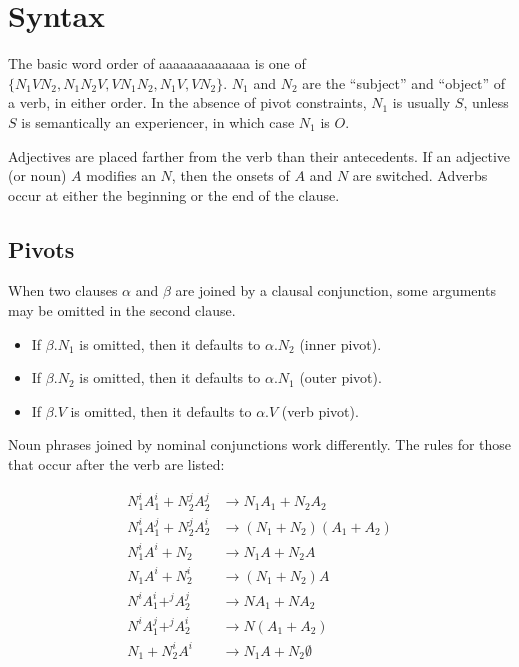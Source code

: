 \documentclass{book}
\newcommand{\lname}{aaaaaaaaaaaaa}
\begin{document}
\chapter{Syntax}

The basic word order of \lname{} is one of $\{N_1VN_2, N_1N_2V, VN_1N_2, N_1V, VN_2\}$. $N_1$ and $N_2$ are the ``subject'' and ``object'' of a verb, in either order. In the absence of pivot constraints, $N_1$ is usually $S$, unless $S$ is semantically an experiencer, in which case $N_1$ is $O$.

Adjectives are placed farther from the verb than their antecedents. If an adjective (or noun) $A$ modifies an $N$, then the onsets of $A$ and $N$ are switched. Adverbs occur at either the beginning or the end of the clause.

\section{Pivots}

When two clauses $\alpha$ and $\beta$ are joined by a clausal conjunction, some arguments may be omitted in the second clause.

\begin{itemize}
  \item If $\beta.N_1$ is omitted, then it defaults to $\alpha.N_2$ (inner pivot).
  \item If $\beta.N_2$ is omitted, then it defaults to $\alpha.N_1$ (outer pivot).
  \item If $\beta.V$ is omitted, then it defaults to $\alpha.V$ (verb pivot).
\end{itemize}

Noun phrases joined by nominal conjunctions work differently. The rules for those that occur after the verb are listed:

\begin{align}
  N_1^i A_1^i + N_2^j A_2^j &\rightarrow N_1 A_1 + N_2 A_2 \\
  N_1^i A_1^j + N_2^j A_2^i &\rightarrow (N_1 + N_2) (A_1 + A_2) \\
  N_1^i A^i + N_2 &\rightarrow N_1 A + N_2 A \\
  N_1 A^i + N_2^i &\rightarrow (N_1 + N_2) A \\
  N^i A_1^i +^j A_2^j &\rightarrow N A_1 + N A_2 \\
  N^i A_1^j +^j A_2^i &\rightarrow N (A_1 + A_2) \\
  N_1 + N_2^i A^i &\rightarrow N_1 A + N_2 \emptyset
\end{align}
\end{document}
